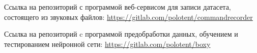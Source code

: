 Ссылка на репозиторий с программой веб-сервисом для записи датасета, состоящего из звуковых файлов: \url{https://gitlab.com/polotent/commandrecorder}

Ссылка на репозиторий c программой предобработки данных, обучением и тестированием нейронной сети: \url{https://gitlab.com/polotent/boxy}
